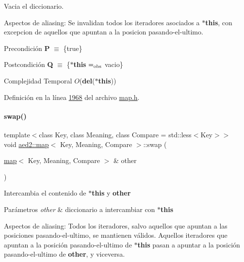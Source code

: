 Vacia el diccionario. 

\begin{DoxyParagraph}{Aspectos de aliasing\+:}
Se invalidan todos los iteradores asociados a {\bfseries $\ast$this}, con excepcion de aquellos que apuntan a la posicion pasando-\/el-\/ultimo.
\end{DoxyParagraph}
\begin{DoxyPrecond}{Precondición}
{\bfseries P} $\equiv$ \{true\} 
\end{DoxyPrecond}
\begin{DoxyPostcond}{Postcondición}
{\bfseries Q} $\equiv$ \{{\bfseries $\ast$this} $=_{\rm obs}$ vacio\}
\end{DoxyPostcond}

\begin{DoxyDescription}
\item[Complejidad Temporal]$O$({\bfseries del}({\bfseries $\ast$this}))
\end{DoxyDescription}

Definición en la línea \hyperlink{map_8h_source_l01968}{1968} del archivo \hyperlink{map_8h_source}{map.\+h}.

\mbox{\label{classaed2_1_1map_a43ddb71cc91e5c6021a7a1f243d6cc4a_a43ddb71cc91e5c6021a7a1f243d6cc4a}} 
\paragraph{\texorpdfstring{swap()}{swap()}}
{\footnotesize\ttfamily template$<$class Key, class Meaning, class Compare = std\+::less$<$\+Key$>$$>$ \\
void \hyperlink{classaed2_1_1map}{aed2\+::map}$<$ Key, Meaning, Compare $>$\+::swap (\begin{DoxyParamCaption}\item[{\hyperlink{classaed2_1_1map}{map}$<$ Key, Meaning, Compare $>$ \&}]{other }\end{DoxyParamCaption})\hspace{0.3cm}{\ttfamily [inline]}}



Intercambia el contenido de {\bfseries $\ast$this} y {\bfseries other} 


\begin{DoxyParams}{Parámetros}
{\em other} & diccionario a intercambiar con {\bfseries $\ast$this}\\
\hline
\end{DoxyParams}
\begin{DoxyParagraph}{Aspectos de aliasing\+:}
Todos los iteradores, salvo aquellos que apuntan a las posiciones pasando-\/el-\/ultimo, se mantienen válidos. Aquellos iteradores que apuntan a la posición pasando-\/el-\/ultimo de {\bfseries $\ast$this} pasan a apuntar a la posición pasando-\/el-\/ultimo de {\bfseries other}, y viceversa.
\end{DoxyParagraph}

